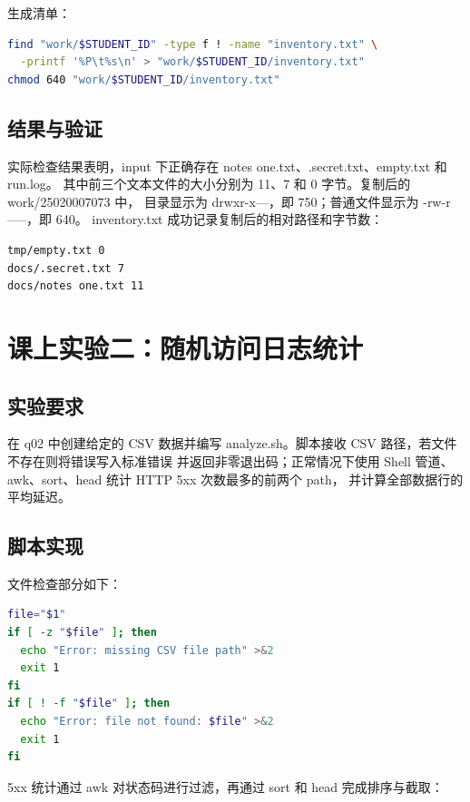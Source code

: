 \documentclass[UTF8]{ctexart}
\begin{document}
生成清单：

\begin{lstlisting}[language=bash]
find "work/$STUDENT_ID" -type f ! -name "inventory.txt" \
  -printf '%P\t%s\n' > "work/$STUDENT_ID/inventory.txt"
chmod 640 "work/$STUDENT_ID/inventory.txt"
\end{lstlisting}

\subsection{结果与验证}

实际检查结果表明，input 下正确存在 notes one.txt、.secret.txt、empty.txt 和 run.log。
其中前三个文本文件的大小分别为 11、7 和 0 字节。复制后的 work/25020007073 中，
目录显示为 drwxr-x---，即 750；普通文件显示为 -rw-r-----，即 640。
inventory.txt 成功记录复制后的相对路径和字节数：

\begin{lstlisting}
tmp/empty.txt 0
docs/.secret.txt 7
docs/notes one.txt 11
\end{lstlisting}


\section{课上实验二：随机访问日志统计}

\subsection{实验要求}

在 q02 中创建给定的 CSV 数据并编写 analyze.sh。脚本接收 CSV 路径，若文件不存在则将错误写入标准错误
并返回非零退出码；正常情况下使用 Shell 管道、awk、sort、head 统计 HTTP 5xx 次数最多的前两个 path，
并计算全部数据行的平均延迟。

\subsection{脚本实现}

文件检查部分如下：

\begin{lstlisting}[language=bash]
file="$1"
if [ -z "$file" ]; then
  echo "Error: missing CSV file path" >&2
  exit 1
fi
if [ ! -f "$file" ]; then
  echo "Error: file not found: $file" >&2
  exit 1
fi
\end{lstlisting}

5xx 统计通过 awk 对状态码进行过滤，再通过 sort 和 head 完成排序与截取：
\end{document}
